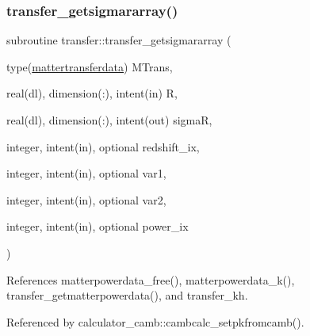 \subsubsection{\texorpdfstring{transfer\+\_\+getsigmararray()}{transfer\_getsigmararray()}}
{\footnotesize\ttfamily subroutine transfer\+::transfer\+\_\+getsigmararray (\begin{DoxyParamCaption}\item[{type(\mbox{\hyperlink{structtransfer_1_1mattertransferdata}{mattertransferdata}})}]{M\+Trans,  }\item[{real(dl), dimension(\+:), intent(in)}]{R,  }\item[{real(dl), dimension(\+:), intent(out)}]{sigmaR,  }\item[{integer, intent(in), optional}]{redshift\+\_\+ix,  }\item[{integer, intent(in), optional}]{var1,  }\item[{integer, intent(in), optional}]{var2,  }\item[{integer, intent(in), optional}]{power\+\_\+ix }\end{DoxyParamCaption})}



References matterpowerdata\+\_\+free(), matterpowerdata\+\_\+k(), transfer\+\_\+getmatterpowerdata(), and transfer\+\_\+kh.



Referenced by calculator\+\_\+camb\+::cambcalc\+\_\+setpkfromcamb().

